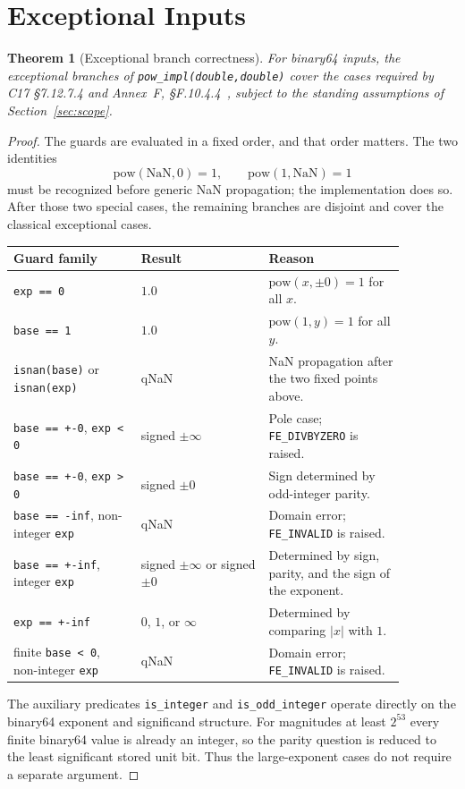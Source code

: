 \documentclass[11pt]{article}
\theoremstyle{plain}
\newtheorem{theorem}{Theorem}
\theoremstyle{remark}
\begin{document}
\section{Exceptional Inputs}
\label{sec:exceptions}

\begin{theorem}[Exceptional branch correctness]
\label{thm:exceptional}
For binary64 inputs, the exceptional branches of
\texttt{pow\_impl(double,double)} cover the cases required by
C17 \S7.12.7.4 and Annex~F, \S F.10.4.4~\cite{c17}, subject to the standing
assumptions of Section~\ref{sec:scope}.
\end{theorem}

\begin{proof}
The guards are evaluated in a fixed order, and that order matters.  The two
identities
\[
  \mathrm{pow}(\mathrm{NaN},0)=1,
  \qquad
  \mathrm{pow}(1,\mathrm{NaN})=1
\]
must be recognized before generic NaN propagation; the implementation does so.
After those two special cases, the remaining branches are disjoint and cover
the classical exceptional cases.

\begin{center}
\begin{tabular}{@{}p{0.28\linewidth}p{0.29\linewidth}p{0.30\linewidth}@{}}
\toprule
Guard family & Result & Reason \\
\midrule
\texttt{exp == 0}
  & $1.0$
  & $\mathrm{pow}(x,\pm0)=1$ for all $x$. \\[4pt]
\texttt{base == 1}
  & $1.0$
  & $\mathrm{pow}(1,y)=1$ for all $y$. \\[4pt]
\texttt{isnan(base)} or \texttt{isnan(exp)}
  & qNaN
  & NaN propagation after the two fixed points above. \\[4pt]
\texttt{base == +-0}, \texttt{exp < 0}
  & signed $\pm\infty$
  & Pole case; \texttt{FE\_DIVBYZERO} is raised. \\[4pt]
\texttt{base == +-0}, \texttt{exp > 0}
  & signed $\pm0$
  & Sign determined by odd-integer parity. \\[4pt]
\texttt{base == -inf}, non-integer \texttt{exp}
  & qNaN
  & Domain error; \texttt{FE\_INVALID} is raised. \\[4pt]
\texttt{base == +-inf}, integer \texttt{exp}
  & signed $\pm\infty$ or signed $\pm0$
  & Determined by sign, parity, and the sign of the exponent. \\[4pt]
\texttt{exp == +-inf}
  & $0$, $1$, or $\infty$
  & Determined by comparing $|x|$ with $1$. \\[4pt]
finite \texttt{base < 0}, non-integer \texttt{exp}
  & qNaN
  & Domain error; \texttt{FE\_INVALID} is raised. \\
\bottomrule
\end{tabular}
\end{center}

The auxiliary predicates \texttt{is\_integer} and \texttt{is\_odd\_integer}
operate directly on the binary64 exponent and significand structure.  For
magnitudes at least $2^{53}$ every finite binary64 value is already an integer,
so the parity question is reduced to the least significant stored unit bit.
Thus the large-exponent cases do not require a separate argument.
\end{proof}
\end{document}

